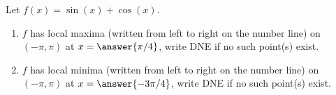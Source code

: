 \documentclass{ximera}
\author{Gregory Hartman \and Matthew Carr}
\begin{document}
\begin{exercise}






Let $f(x)=\sin(x)+\cos(x)$.
\begin{enumerate}
\item		$f$ has local maxima (written from left to right on the number line) on $(-\pi,\pi)$ at $x=\answer{\pi/4}$, write DNE if no such point(s) exist.
\item		$f$ has local minima (written from left to right on the number line) on $(-\pi,\pi)$ at $x=\answer{-3\pi/4}$, write DNE if no such point(s) exist.
\end{enumerate}

\end{exercise}
\end{document}
